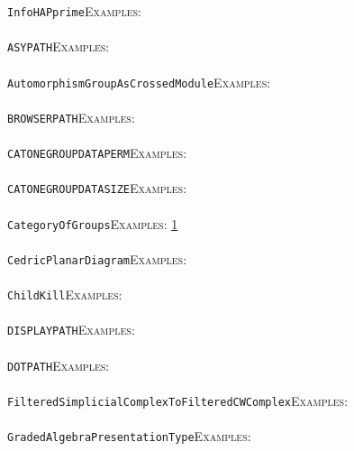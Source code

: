 \documentclass[a4paper,11pt]{report}
\begin{document}
{{ \texttt{InfoHAPprime}{\nobreakspace}{\nobreakspace}{\nobreakspace}{\nobreakspace}\textsc{Examples:} \\
 \\
 \texttt{ASY{\textunderscore}PATH}{\nobreakspace}{\nobreakspace}{\nobreakspace}{\nobreakspace}\textsc{Examples:} \\
 \\
 \texttt{AutomorphismGroupAsCrossedModule}{\nobreakspace}{\nobreakspace}{\nobreakspace}{\nobreakspace}\textsc{Examples:} \\
 \\
 \texttt{BROWSER{\textunderscore}PATH}{\nobreakspace}{\nobreakspace}{\nobreakspace}{\nobreakspace}\textsc{Examples:} \\
 \\
 \texttt{CATONEGROUP{\textunderscore}DATA{\textunderscore}PERM}{\nobreakspace}{\nobreakspace}{\nobreakspace}{\nobreakspace}\textsc{Examples:} \\
 \\
 \texttt{CATONEGROUP{\textunderscore}DATA{\textunderscore}SIZE}{\nobreakspace}{\nobreakspace}{\nobreakspace}{\nobreakspace}\textsc{Examples:} \\
 \\
 \texttt{Category{\textunderscore}Of{\textunderscore}Groups}{\nobreakspace}{\nobreakspace}{\nobreakspace}{\nobreakspace}\textsc{Examples:} \href{../www/SideLinks/About/aboutAbelianCategories.html} {1}{\nobreakspace} \\
 \\
 \texttt{Cedric{\textunderscore}PlanarDiagram}{\nobreakspace}{\nobreakspace}{\nobreakspace}{\nobreakspace}\textsc{Examples:} \\
 \\
 \texttt{ChildKill}{\nobreakspace}{\nobreakspace}{\nobreakspace}{\nobreakspace}\textsc{Examples:} \\
 \\
 \texttt{DISPLAY{\textunderscore}PATH}{\nobreakspace}{\nobreakspace}{\nobreakspace}{\nobreakspace}\textsc{Examples:} \\
 \\
 \texttt{DOT{\textunderscore}PATH}{\nobreakspace}{\nobreakspace}{\nobreakspace}{\nobreakspace}\textsc{Examples:} \\
 \\
 \texttt{FilteredSimplicialComplexToFilteredCWComplex}{\nobreakspace}{\nobreakspace}{\nobreakspace}{\nobreakspace}\textsc{Examples:} \\
 \\
 \texttt{GradedAlgebraPresentationType}{\nobreakspace}{\nobreakspace}{\nobreakspace}{\nobreakspace}\textsc{Examples:} \\
}}
\end{document}
